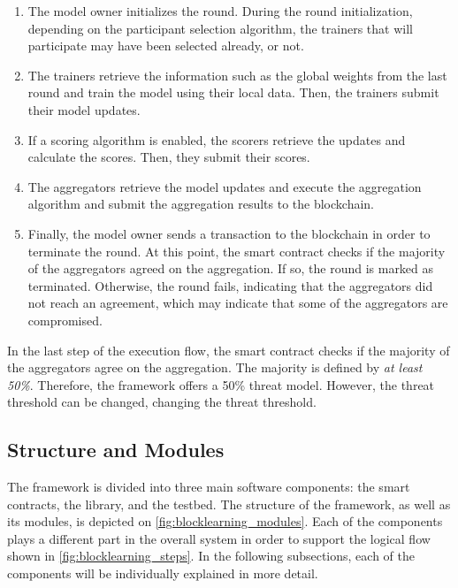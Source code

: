 \begin{enumerate}
    \item The model owner initializes the round. During the round initialization, depending on the participant selection algorithm, the trainers that will participate may have been selected already, or not.
    
    \item The trainers retrieve the information such as the global weights from the last round and train the model using their local data. Then, the trainers submit their model updates.
    
    \item If a scoring algorithm is enabled, the scorers retrieve the updates and calculate the scores. Then, they submit their scores.
    
    \item The aggregators retrieve the model updates and execute the aggregation algorithm and submit the aggregation results to the blockchain.
    
    \item Finally, the model owner sends a transaction to the blockchain in order to terminate the round. At this point, the smart contract checks if the majority of the aggregators agreed on the aggregation. If so, the round is marked as terminated. Otherwise, the round fails, indicating that the aggregators did not reach an agreement, which may indicate that some of the aggregators are compromised.
\end{enumerate}

In the last step of the execution flow, the smart contract checks if the majority of the aggregators agree on the aggregation. The majority is defined by \textit{at least 50\%}. Therefore, the framework offers a 50\% threat model. However, the threat threshold can be changed, changing the threat threshold.

\subsection{Structure and Modules}\label{meth:struct_modules}

The framework is divided into three main software components: the smart contracts, the library, and the testbed. The structure of the framework, as well as its modules, is depicted on \autoref{fig:blocklearning_modules}. Each of the components plays a different part in the overall system in order to support the logical flow shown in \autoref{fig:blocklearning_steps}. In the following subsections, each of the components will be individually explained in more detail.

